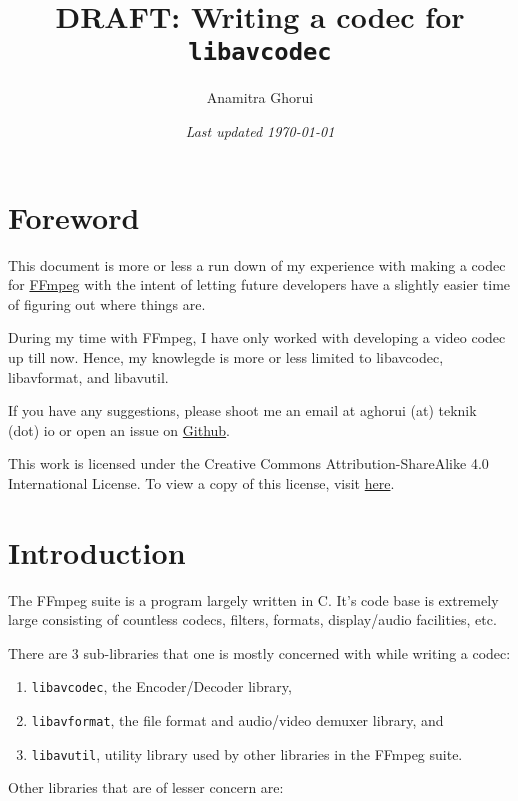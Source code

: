 \documentclass{article}
\begin{document}
\title{DRAFT: Writing a codec for \texttt{libavcodec}}
\author{Anamitra Ghorui}
\date{\emph{Last updated \today}}
\maketitle

\tableofcontents

\section{Foreword}

This document is more or less a run down of my experience with making a codec 
for \href{https://ffmpeg.org}{FFmpeg} with the intent of letting future
developers have a slightly easier time of figuring out where things are.

During my time with FFmpeg, I have only worked with developing a video codec up 
till now. Hence, my knowlegde is more or less limited to libavcodec, 
libavformat, and libavutil.

If you have any suggestions, please shoot me an email at aghorui (at) teknik 
(dot) io or open an issue on 
\href{https://github.com/daujerrine/ffmpeg-doc}{Github}.

This work is licensed under the Creative Commons Attribution-ShareAlike 4.0
International License. To view a copy of this license, visit
\href{http://creativecommons.org/licenses/by-sa/4.0/}{here}.

\section{Introduction}

The FFmpeg suite is a program largely written in C. It's code base is extremely
large consisting of countless codecs, filters, formats, display/audio facilities,
etc.

There are 3 sub-libraries that one is mostly concerned with while writing a codec:

\begin{enumerate}
\item \texttt{libavcodec}, the Encoder/Decoder library,
\item \texttt{libavformat}, the file format and audio/video demuxer library, and
\item \texttt{libavutil}, utility library used by other libraries in the FFmpeg 
      suite.
\end{enumerate}

Other libraries that are of lesser concern are:
\end{document}
